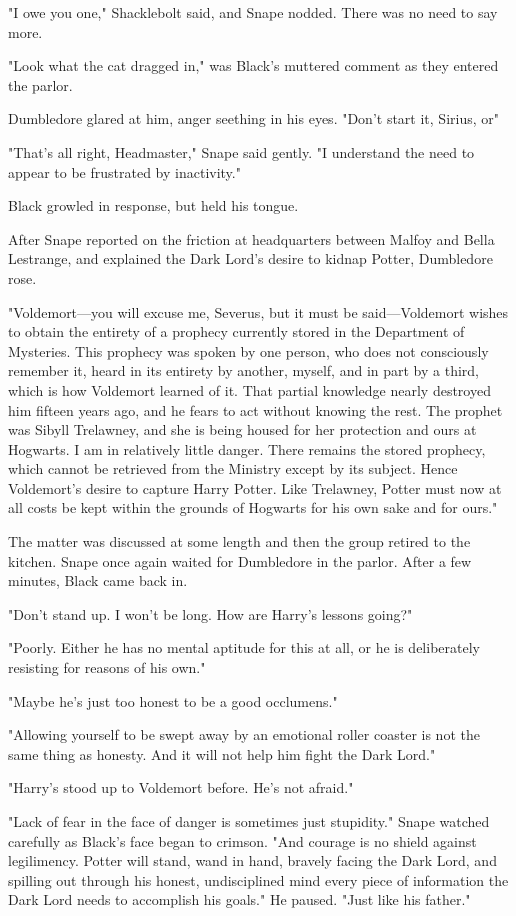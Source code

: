 "I owe you one," Shacklebolt said, and Snape nodded. There was no need to say more.

"Look what the cat dragged in," was Black's muttered comment as they entered the parlor.

Dumbledore glared at him, anger seething in his eyes. "Don't start it, Sirius, or{\el}"

"That's all right, Headmaster," Snape said gently. "I understand the need to appear to be frustrated by inactivity."

Black growled in response, but held his tongue.

After Snape reported on the friction at headquarters between Malfoy and Bella Lestrange, and explained the Dark Lord's desire to kidnap Potter, Dumbledore rose.

"Voldemort—you will excuse me, Severus, but it must be said—Voldemort wishes to obtain the entirety of a prophecy currently stored in the Department of Mysteries. This prophecy was spoken by one person, who does not consciously remember it, heard in its entirety by another, myself, and in part by a third, which is how Voldemort learned of it. That partial knowledge nearly destroyed him fifteen years ago, and he fears to act without knowing the rest. The prophet was Sibyll Trelawney, and she is being housed for her protection and ours at Hogwarts. I am in relatively little danger. There remains the stored prophecy, which cannot be retrieved from the Ministry except by its subject. Hence Voldemort's desire to capture Harry Potter. Like Trelawney, Potter must now at all costs be kept within the grounds of Hogwarts for his own sake and for ours."

The matter was discussed at some length and then the group retired to the kitchen. Snape once again waited for Dumbledore in the parlor. After a few minutes, Black came back in.

"Don't stand up. I won't be long. How are Harry's lessons going?"

"Poorly. Either he has no mental aptitude for this at all, or he is deliberately resisting for reasons of his own."

"Maybe he's just too honest to be a good occlumens."

"Allowing yourself to be swept away by an emotional roller coaster is not the same thing as honesty. And it will not help him fight the Dark Lord."

"Harry's stood up to Voldemort before. He's not afraid."

"Lack of fear in the face of danger is sometimes just stupidity." Snape watched carefully as Black's face began to crimson. "And courage is no shield against legilimency. Potter will stand, wand in hand, bravely facing the Dark Lord, and spilling out through his honest, undisciplined mind every piece of information the Dark Lord needs to accomplish his goals." He paused. "Just like his father."

